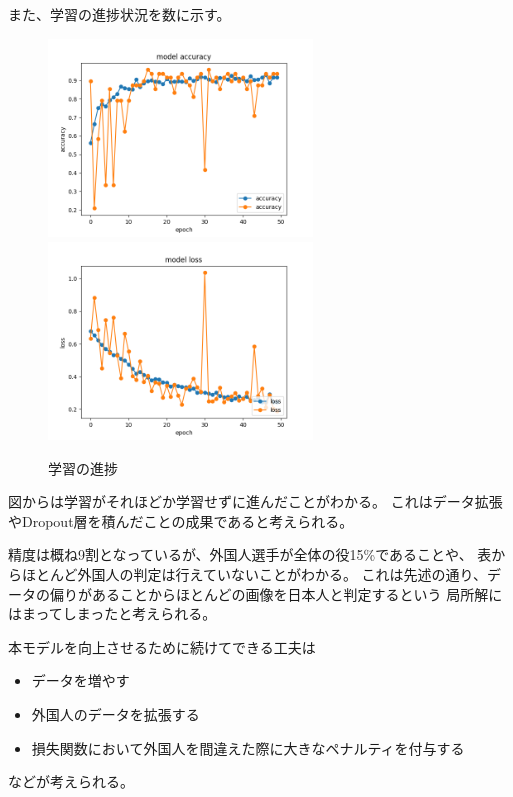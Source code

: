 \documentclass[uplatex]{jsarticle}
\begin{document}
また、学習の進捗状況を数に示す。

\begin{figure}[H]
  \begin{center}
    \includegraphics[width=7cm]{../data/history/acc.png}
    \includegraphics[width=7cm]{../data/history/loss.png}
    \caption{学習の進捗}
  \end{center}
\end{figure}

図からは学習がそれほどか学習せずに進んだことがわかる。
これはデータ拡張やDropout層を積んだことの成果であると考えられる。

精度は概ね9割となっているが、外国人選手が全体の役15\%であることや、
表からほとんど外国人の判定は行えていないことがわかる。
これは先述の通り、データの偏りがあることからほとんどの画像を日本人と判定するという
局所解にはまってしまったと考えられる。

本モデルを向上させるために続けてできる工夫は
\begin{itemize}
  \item データを増やす
  \item 外国人のデータを拡張する
  \item 損失関数において外国人を間違えた際に大きなペナルティを付与する
\end{itemize}

などが考えられる。
\end{document}
